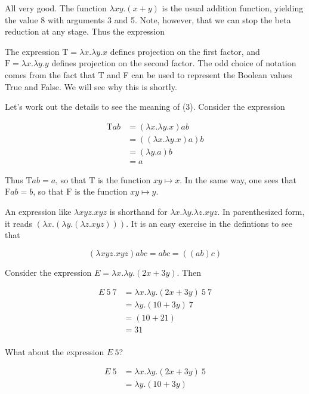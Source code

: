 All very good.  The function $\lambda xy.(x+y)$ is the usual addition function, yielding the value 8 with arguments 3 and 5.  Note, however, that we can stop the beta reduction at any stage.  Thus the expression

The expression $\text{T} = \lambda x.\lambda y . x$ defines projection on the first factor, and $\text{F} = \lambda x.\lambda y . y$ defines projection on the second factor.  The odd choice of notation comes from the fact that T and F can be used to represent the Boolean values True and False.  We will see why this is shortly.





Let's work out the details to see the meaning of (3).  Consider the expression 

\begin{align}
 \text{T}ab &= (\lambda x.\lambda y . x)ab \\
 &= ((\lambda x.\lambda y . x)a)b  \\
&= (\lambda y.a) b \\
&= a
\end{align}

Thus $ \text{T}ab = a$, so that $ \text{T}$ is the function $xy \mapsto x$.  In the same way, one sees that $ \text{F}ab = b$, so that $ \text{F}$ is the function $xy \mapsto y$.  


An expression like $\lambda xyz.xyz$ is shorthand for $\lambda x. \lambda y. \lambda z. xyz$.  In parenthesized form, it reads $(\lambda x.(\lambda y.(\lambda z.xyz)))$. It is an easy exercise in the defintions to see that 

\begin{equation}
  (\lambda xyz .xyz) abc = abc = ((ab)c)
\end{equation}


Consider the expression $E = \lambda x. \lambda y. (2x + 3y)$. Then 

\begin{align}
 E\ 5\ 7 &= \lambda x. \lambda y. (2x + 3y)\ 5\ 7\\
  &= \lambda y . (10 + 3y)\ 7 \\
  &= (10 + 21) \\
  &= 31 \\
\end{align}

What about the expression $E\ 5$?  

\begin{align}
 E\ 5 &= \lambda x. \lambda y. (2x + 3y)\ 5\\
  &= \lambda y . (10 + 3y) \\
\end{align}

